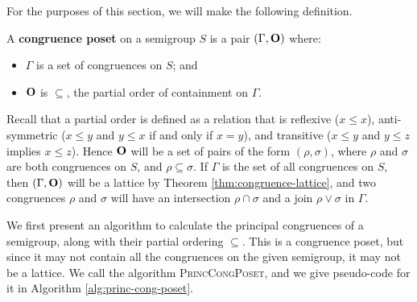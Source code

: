 For the purposes of this section, we will make the following definition.

\begin{definition}
  \label{def:congruence-poset}
  A \textbf{congruence poset} on a semigroup $S$ is a pair $(\Gamma, \mathbf{O})$
  where:
  \begin{itemize}
  \item $\Gamma$ is a set of congruences on $S$; and
  \item $\mathbf{O}$ is $\subseteq$, the partial order of containment on $\Gamma$.
  \end{itemize}
\end{definition}

Recall that a partial order is defined as a relation that is reflexive
($x \leq x$), anti-symmetric ($x \leq y$ and $y \leq x$ if and only if $x = y$),
and transitive ($x \leq y$ and $y \leq z$ implies $x \leq z$).
Hence $\mathbf{O}$ will be a set of pairs of the form $(\rho, \sigma)$, where $\rho$
and $\sigma$ are both congruences on $S$, and $\rho \subseteq \sigma$.  If
$\Gamma$ is the set of all congruences on $S$, then $(\Gamma, \mathbf{O})$ will be a
lattice by Theorem \ref{thm:congruence-lattice}, and two congruences $\rho$ and
$\sigma$ will have an intersection $\rho \cap \sigma$ and a join
$\rho \vee \sigma$ in $\Gamma$.

We first present an algorithm to calculate the principal congruences of a
semigroup, along with their partial ordering $\subseteq$.  This is a congruence
poset, but since it may not contain all the congruences on the given semigroup,
it may not be a lattice.  We call the algorithm \textsc{PrincCongPoset}, and we
give pseudo-code for it in Algorithm \ref{alg:princ-cong-poset}.

